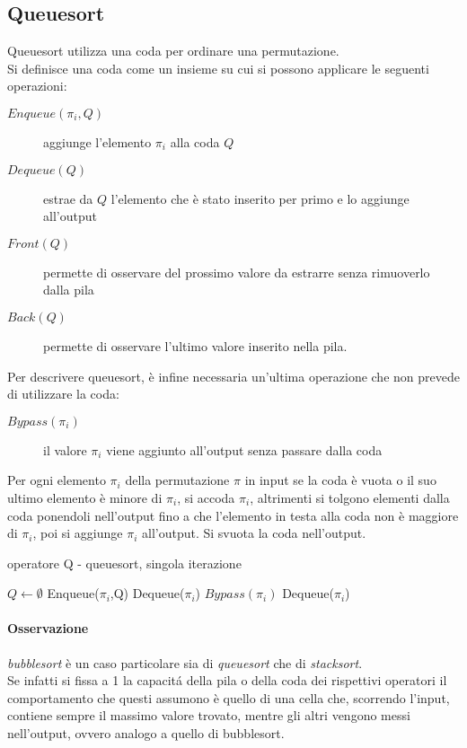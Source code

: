\subsection{Queuesort}
Queuesort utilizza una coda per ordinare una permutazione.\\
Si definisce una coda come un insieme su cui si possono applicare le seguenti operazioni:
\begin{description}
   \item[$Enqueue(\pi_i,Q)$] aggiunge l'elemento $\pi_i$ alla coda $Q$
   \item[$Dequeue(Q)$] estrae da $Q$ l'elemento che \`e stato inserito per primo e lo aggiunge all'output
   \item[$Front(Q)$] permette di osservare del prossimo valore da estrarre senza rimuoverlo dalla pila
   \item[$Back(Q)$] permette di osservare l'ultimo valore inserito nella pila.
\end{description}
Per descrivere queuesort, \`e infine necessaria un'ultima operazione che non prevede di utilizzare la coda:\begin{description}\item[$Bypass(\pi_i)$] il valore $\pi_i$ viene aggiunto all'output senza passare dalla coda\end{description}
Per ogni elemento $\pi_i$ della permutazione $\pi$ in input se la coda \`e vuota o il suo ultimo elemento \`e minore di $\pi_i$, si accoda $\pi_i$, altrimenti si tolgono elementi dalla coda ponendoli nell'output fino a che l'elemento in testa alla coda non \`e maggiore di $\pi_i$, poi si aggiunge $\pi_i$ all'output. Si svuota la coda nell'output. 
\begin{algorithm}[H]
   \caption{operatore Q - queuesort, singola iterazione}
\begin{algorithmic}[1]
\State $Q\leftarrow\emptyset$
\State Enqueue($\pi_i$,Q)
\Else
{}
\State Dequeue($\pi_i$)
\EndWhile
\State $Bypass(\pi_i)$
\EndIf
\EndFor
{}
\State Dequeue($\pi_i$)
\EndWhile
\end{algorithmic}
\end{algorithm}
\paragraph*{Osservazione}\textit{bubblesort} \`e un caso particolare sia di \textit{queuesort} che di \textit{stacksort}.\\
Se infatti si fissa a 1 la capacit\'a della pila o della coda dei rispettivi operatori il comportamento che questi assumono \`e quello di una cella che, scorrendo l'input, contiene sempre il massimo valore trovato, mentre gli altri vengono messi nell'output, ovvero analogo a quello di bubblesort.
